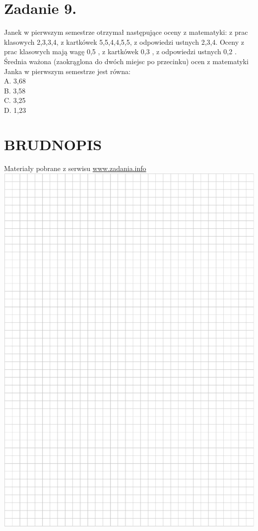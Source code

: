 \documentclass[10pt]{article}
\begin{document}
\section*{Zadanie 9.}
Janek w pierwszym semestrze otrzymał następujące oceny z matematyki: z prac klasowych 2,3,3,4, z kartkówek 5,5,4,4,5,5, z odpowiedzi ustnych 2,3,4. Oceny z prac klasowych mają wagę 0,5 , z kartkówek 0,3 , z odpowiedzi ustnych 0,2 . Średnia ważona (zaokrąglona do dwóch miejsc po przecinku) ocen z matematyki Janka w pierwszym semestrze jest równa:\\
A. 3,68\\
B. 3,58\\
C. 3,25\\
D. 1,23

\section*{BRUDNOPIS}
Materiały pobrane z serwisu \href{http://www.zadania.info}{www.zadania.info}\\
\includegraphics[max width=\textwidth, center]{2024_11_21_94f02db55673a8a7b820g-05}
\end{document}
